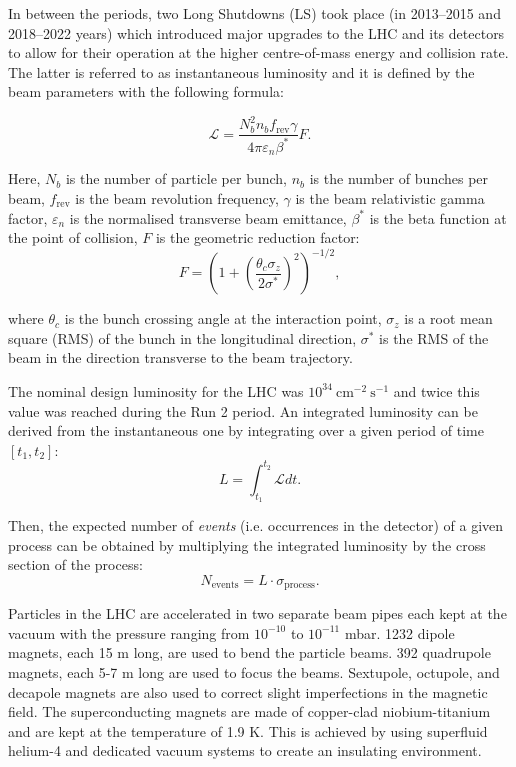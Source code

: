 In between the periods, two Long Shutdowns (LS) took place (in 2013–2015 and 2018–2022 years) which introduced major upgrades to the LHC and its detectors to allow for their operation at the higher centre-of-mass energy and collision rate. The latter is referred to as instantaneous luminosity and it is defined by the beam parameters with the following formula:  

\begin{equation}
    \mathcal{L} = \dfrac{N_b^2 n_b f_\text{rev} \gamma}{4\pi \varepsilon_n \beta^*}F.
\end{equation}

Here, $N_b$ is the number of particle per bunch, $n_b$ is the number of bunches per beam, $f_\text{rev}$ is the beam revolution frequency, $\gamma$ is the beam relativistic gamma factor, $\varepsilon_n$ is the normalised transverse beam emittance, $\beta^*$ is the beta function at the point of collision, $F$ is the geometric reduction factor:
\begin{equation}
    F = \left(1 + \left(\dfrac{\theta_c \sigma_z}{2\sigma^*}\right)^2\right)^{-1/2},
\end{equation}

where $\theta_c$ is the bunch crossing angle at the interaction point, $\sigma_z$ is a root mean square (RMS) of the bunch in the longitudinal direction, $\sigma^*$ is the RMS of the beam in the direction transverse to the beam trajectory.  

The nominal design luminosity for the LHC was $10^{34} ~\text{cm}^{-2}~\text{s}^{-1}$ and twice this value was reached during the Run 2 period.  An integrated luminosity can be derived from the instantaneous one by integrating over a given period of time $[t_1, t_2]$:
\begin{equation}
L = \int_{t_1}^{t_2} \mathcal{L}dt.
\end{equation} 

Then, the expected number of \textit{events} (i.e. occurrences in the detector) of a given process can be obtained by multiplying the integrated luminosity by the cross section of the process:
\begin{equation}
    N_\text{events} = L \cdot \sigma_\text{process}.
\end{equation}

Particles in the LHC are accelerated in two separate beam pipes each kept at the vacuum with the pressure ranging from $10^{-10}$ to $10^{-11}$ mbar. 1232 dipole magnets, each 15 m long, are used to bend the particle beams. 392 quadrupole magnets, each 5-7 m long are used to focus the beams. Sextupole, octupole, and decapole magnets are also used to correct slight imperfections in the magnetic field. The superconducting magnets are made of copper-clad niobium-titanium and are kept at the temperature of 1.9 K. This is achieved by using superfluid helium-4 and dedicated vacuum systems to create an insulating environment.   

